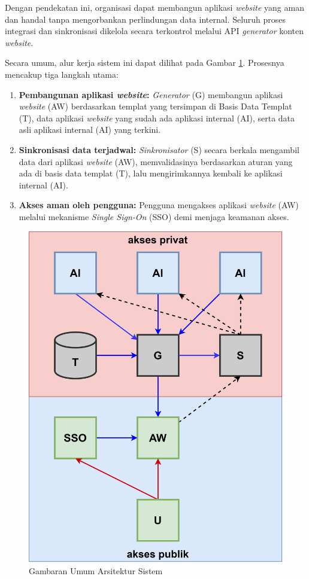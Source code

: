 Dengan pendekatan ini, organisasi dapat membangun aplikasi \textit{website} yang aman dan handal tanpa mengorbankan perlindungan data internal. Seluruh proses integrasi dan sinkronisasi dikelola secara terkontrol melalui API \textit{generator} konten \textit{website}.

Secara umum, alur kerja sistem ini dapat dilihat pada Gambar \ref{fig:GambaranUmum}. Prosesnya mencakup tiga langkah utama:
\begin{enumerate}
    
    \item \textbf{Pembangunan aplikasi \textit{website}:} \textit{Generator} (G) membangun aplikasi \textit{website} (AW) berdasarkan templat yang tersimpan di Basis Data Templat (T), data aplikasi \textit{website} yang sudah ada aplikasi internal (AI), serta data asli aplikasi internal (AI) yang terkini.
    
    \item \textbf{Sinkronisasi data terjadwal:} \textit{Sinkronisator} (S) secara berkala mengambil data dari aplikasi \textit{website} (AW), memvalidasinya berdasarkan aturan yang ada di basis data templat (T), lalu mengirimkannya kembali ke aplikasi internal (AI).
    
    \item \textbf{Akses aman oleh pengguna:} Pengguna mengakses aplikasi \textit{website} (AW) melalui mekanisme \textit{Single Sign-On} (SSO) demi menjaga keamanan akses.
    
\end{enumerate}

\begin{figure}[H]
    \centering
    \includegraphics[width=0.5\linewidth]{figures/GambaranUmum.png}
    \caption{Gambaran Umum Arsitektur Sistem}
    \label{fig:GambaranUmum}
\end{figure}
